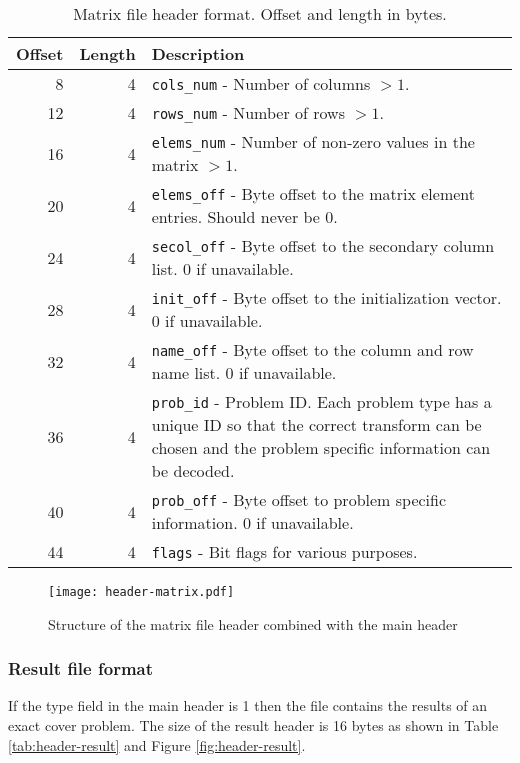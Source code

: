 \begin{table}[tbp]
	\centering
	\begin{tabular}{|r|r|p{3.2in}|}
		\hline
		\bf Offset & \bf Length & \bf Description \\ \hline
		8  & 4 & \texttt{cols\_num} - Number of columns $> 1$. \\ \hline
		12 & 4 & \texttt{rows\_num} - Number of rows $> 1$. \\ \hline
		16 & 4 & \texttt{elems\_num} - Number of non-zero values in the matrix $> 1$. \\ \hline
		20 & 4 & \texttt{elems\_off} - Byte offset to the matrix element entries. Should never be 0. \\ \hline
		24 & 4 & \texttt{secol\_off} - Byte offset to the secondary column list. 0 if unavailable. \\ \hline
		28 & 4 & \texttt{init\_off} -  Byte offset to the initialization vector. 0 if unavailable. \\ \hline
		32 & 4 & \texttt{name\_off} - Byte offset to the column and row name list. 0 if unavailable. \\ \hline
		36 & 4 & \texttt{prob\_id} - Problem ID. Each problem type has a unique ID so that the correct transform can be chosen and the problem specific information can be decoded. \\ \hline
		40 & 4 & \texttt{prob\_off} - Byte offset to problem specific information. 0 if unavailable. \\ \hline
		44 & 4 & \texttt{flags} - Bit flags for various purposes. \\ \hline
	\end{tabular}
	\caption{Matrix file header format. Offset and length in bytes.}
	\label{tab:header-matrix}
\end{table}

\begin{figure}[tbp]
	\centering
	\texttt{[image: header-matrix.pdf]}
	\caption{Structure of the matrix file header combined with the main header}
	\label{fig:header-matrix}
\end{figure}


\subsubsection{Result file format}

If the type field in the main header is 1 then the file contains the results of an exact cover problem.
The size of the result header is 16 bytes as shown in Table \ref{tab:header-result} and Figure \ref{fig:header-result}.

